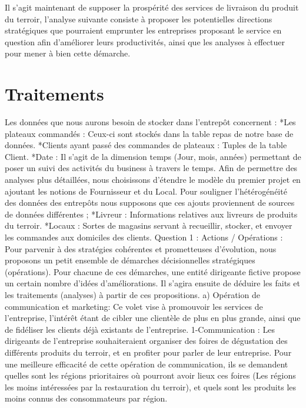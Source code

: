 \documentclass[11pt]{article}
\begin{document}
Il s’agit maintenant de supposer la prospérité des services de livraison du produit du terroir, l’analyse suivante consiste à proposer les potentielles directions stratégiques que pourraient emprunter les entreprises proposant le service en question afin d’améliorer leurs productivités, ainsi que les analyses à effectuer pour mener à bien cette démarche.

 \section{Traitements }

Les données que nous aurons besoin de stocker dans l’entrepôt concernent : 
*Les plateaux commandés : Ceux-ci sont stockés dans la table repas de notre base de données.
*Clients ayant passé des commandes de plateaux : Tuples de la table Client.
*Date : Il s’agit de la dimension temps (Jour, mois, années) permettant de poser un suivi des activités du business à travers le temps.
Afin de permettre des analyses plus détaillées, nous choisissons d’étendre le modèle du premier projet en ajoutant les notions de Fournisseur et du Local. Pour souligner l’hétérogénéité des données des entrepôts nous supposons que ces ajouts proviennent de sources de données différentes ;
*Livreur : Informations relatives aux livreurs de produits du terroir.
 *Locaux : Sortes de magasins servant à recueillir, stocker, et envoyer les commandes aux domiciles des clients.
Question 1 : Actions / Opérations : 
Pour parvenir à des stratégies cohérentes et prometteuses d’évolution, nous proposons un petit ensemble de démarches décisionnelles stratégiques (opérations). Pour chacune de ces démarches, une entité dirigeante fictive propose un certain nombre d’idées d’améliorations.
Il s’agira ensuite de déduire les faits et les traitements (analyses) à partir de ces propositions.
a)	Opération de communication et marketing: 
Ce volet vise à promouvoir les services de l’entreprise, l’intérêt étant de cibler une clientèle de plus en plus grande, ainsi que de fidéliser les clients déjà existants de l’entreprise.
1-Communication : Les dirigeants de l’entreprise souhaiteraient organiser des foires de dégustation des différents produits du terroir, et en profiter pour parler de leur entreprise.  Pour une meilleure efficacité de cette opération de communication, ils se demandent quelles sont les régions prioritaires où pourront avoir lieux ces foires (Les régions les moins intéressées par la restauration du terroir), et quels sont les produits les moins connus des consommateurs par région.
\end{document}
